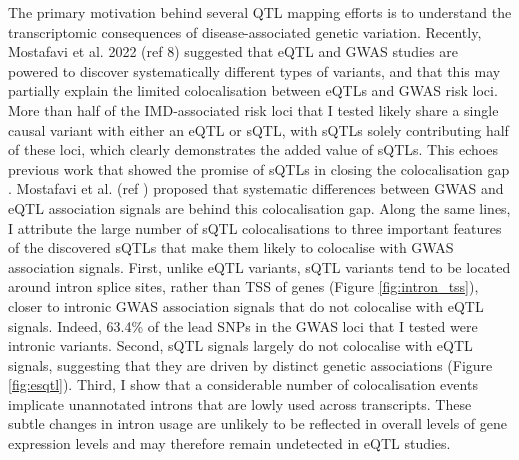 The primary motivation behind several QTL mapping efforts is to understand the transcriptomic consequences of disease-associated genetic variation. Recently, Mostafavi et al. 2022 (ref 8) suggested that eQTL and GWAS studies are powered to discover systematically different types of variants, and that this may partially explain the limited colocalisation between eQTLs and GWAS risk loci. More than half of the IMD-associated risk loci that I tested likely share a single causal variant with either an eQTL or sQTL, with sQTLs solely contributing half of these loci, which clearly demonstrates the added value of sQTLs. This echoes previous work that showed the promise of sQTLs in closing the colocalisation gap \cite{Mu2021-ar,Kim-Hellmuth2020-gz,Liu2018-fh}. Mostafavi et al. (ref \cite{Mostafavi2022-tg}) proposed that systematic differences between GWAS and eQTL association signals are behind this colocalisation gap. Along the same lines, I attribute the large number of sQTL colocalisations to three important features of the discovered sQTLs that make them likely to colocalise with GWAS association signals. First, unlike eQTL variants, sQTL variants tend to be located around intron splice sites, rather than TSS of genes (Figure \ref{fig:intron_tss}), closer to intronic GWAS association signals that do not colocalise with eQTL signals. Indeed, 63.4\% of the lead SNPs in the GWAS loci that I tested were intronic variants. Second, sQTL signals largely do not colocalise with eQTL signals, suggesting that they are driven by distinct genetic associations (Figure \ref{fig:esqtl}). Third, I show that a considerable number of colocalisation events implicate unannotated introns that are lowly used across transcripts. These subtle changes in intron usage are unlikely to be reflected in overall levels of gene expression levels and may therefore remain undetected in eQTL studies. \\


